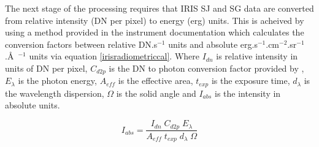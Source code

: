The next stage of the processing requires that IRIS SJ and SG data are converted from relative intensity (DN per pixel) to energy (erg) units. This is acheived by using a method provided in the instrument documentation \citep{2014SoPh..289.2733D} which calculates the conversion factors between relative DN.s$^{-1}$ units and absolute erg.s$^{-1}$.cm$^{-2}$.sr$^{-1}$.\AA\ $^{-1}$ units via equation \ref{irisradiometriccal}. Where $I_{dn}$ is relative intensity in units of DN per pixel, $C_{d2p}$ is the DN to photon conversion factor provided by \cite{2014SoPh..289.2733D}, $E_{\lambda}$ is the photon energy, $A_{eff}$ is the effective area, $t_{exp}$ is the exposure time, $d_{\lambda}$ is the wavelength dispersion, $\Omega$ is the solid angle and $I_{abs}$ is the intensity in absolute units.

\begin{equation}\label{irisradiometriccal}
I_{abs} = \frac{{I_{dn}} \; {C_{d2p}} \; {E_{\lambda}}}{{A_{eff}} \; {t_{exp}} \; {d_{\lambda}} \; {\Omega}}
\end{equation}



